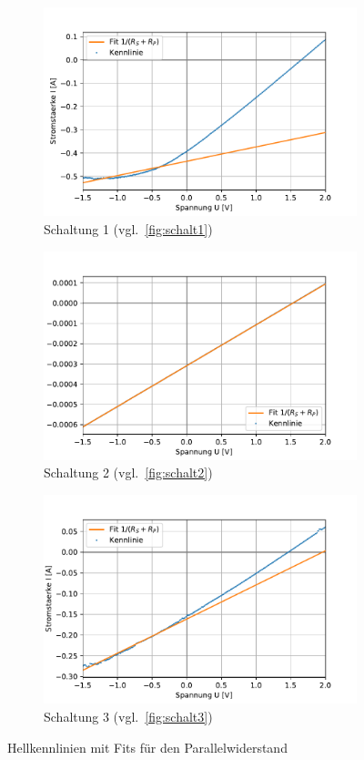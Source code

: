 \documentclass[slug=SZ, room=Hermann-Krone-Bau\,\ Labor\ 1.25, supervisor=Martin\ Kroll]{../../Lab_Report_LaTeX/lab_report}
\begin{document}
\begin{figure}[H]\centering
        \begin{subfigure}[b]{1\textwidth}\centering
                \includegraphics[width=.6\columnwidth]{figs/python/3x3_schaltung_2_rsrp.pdf}
                \caption{Schaltung 1 (vgl.~\ref{fig:schalt1})}
                \label{diag:hellschalt1fit}
        \end{subfigure}
        \begin{subfigure}[b]{1\textwidth}\centering
                \includegraphics[width=.6\columnwidth]{figs/python/3x3_schaltung_3_rsrp.pdf}
                \caption{Schaltung 2 (vgl.~\ref{fig:schalt2})}
                \label{diag:hellschalt2fit}
        \end{subfigure}
        \begin{subfigure}[b]{1\textwidth}\centering
                \includegraphics[width=.6\columnwidth]{figs/python/3x3_schaltung_4_rsrp.pdf}
                \caption{Schaltung 3 (vgl.~\ref{fig:schalt3})}
                \label{diag:hellschalt3fit}
        \end{subfigure}
        \caption{Hellkennlinien mit Fits f\"ur den Parallelwiderstand}
        \label{fig:hellkennfit}
\end{figure}
\end{document}
